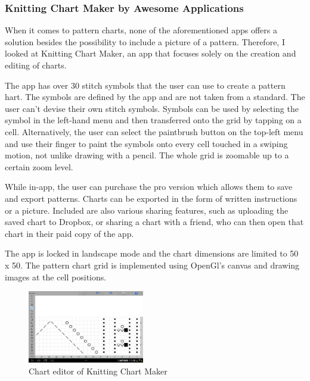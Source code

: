 \subsubsection{Knitting Chart Maker by Awesome Applications}
When it comes to pattern charts, none of the aforementioned apps offers a solution besides the possibility to include a picture of a pattern. Therefore, I looked at Knitting Chart Maker, an app that focuses solely on the creation and editing of charts.

The app has over 30 stitch symbols that the user can use to create a pattern hart. The symbols are defined by the app and are not taken from a standard. The user can’t devise their own stitch symbols. Symbols can be used by selecting the symbol in the left-hand menu and then transferred onto the grid by tapping on a cell. Alternatively, the user can select the paintbrush button on the top-left menu and use their finger to paint the symbols onto every cell touched in a swiping motion, not unlike drawing with a pencil. The whole grid is zoomable up to a certain zoom level.

While in-app, the user can purchase the pro version which allows them to save and export patterns. Charts can be exported in the form of written instructions or a picture. Included are also various sharing features, such as uploading the saved chart to Dropbox, or sharing a chart with a friend, who can then open that chart in their paid copy of the app.

The app is locked in landscape mode and the chart dimensions are limited to 50 x 50. The pattern chart grid is implemented using OpenGl’s canvas and drawing images at the cell positions.

\begin{figure}[H]
  \begin{center}
\includegraphics[width=2in]{images/image03.png}
\caption[Chart editor of Knitting Chart Maker ]{Chart editor of Knitting Chart Maker}
\label{fig_knittingchartmaker}
\end{center}
\end{figure}

